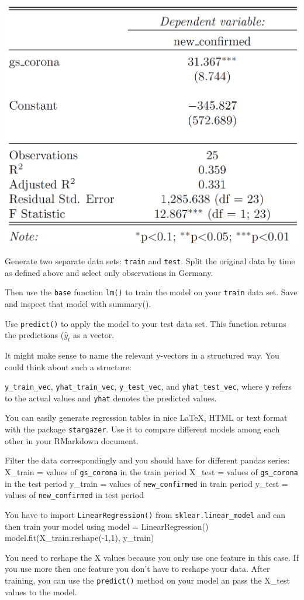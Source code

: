 \documentclass[
  11pt,
]{article}
\newenvironment{tips}[1]
  {
  \begin{itemize}
  \footnotesize
  \renewcommand{\labelitemi}{
    \raisebox{-.7\height}[0pt][0pt]{
      {\setkeys{Gin}{width=3em,keepaspectratio}
        \texttt{[image: images/\#1.png]}}
    }
  }
  \setlength{\fboxsep}{1em}
  \begin{rbox}
  \item
  }
  {
  \end{rbox}
  \end{itemize}
  }
\begin{document}
\begin{center}\includegraphics[width=0.5\linewidth]{plots/reg_table} \end{center}

\begin{tips}r

Generate two separate data sets: \texttt{train} and \texttt{test}. Split the original data by time as defined above and select only observations in Germany.

Then use the \texttt{base} function \texttt{lm()} to train the model on your \texttt{train} data set. Save and inspect that model with summary().

Use \texttt{predict()} to apply the model to your test data set. This function returns the predictions (\(\hat{y}_t\) as a vector.

It might make sense to name the relevant y-vectors in a structured way. You could think about such a structure:

\texttt{y\_train\_vec}, \texttt{yhat\_train\_vec}, \texttt{y\_test\_vec}, and \texttt{yhat\_test\_vec}, where \texttt{y} refers to the actual values and \texttt{yhat} denotes the predicted values.

You can easily generate regression tables in nice LaTeX, HTML or text format with the package \texttt{stargazer}. Use it to compare different models among each other in your RMarkdown document.

\end{tips}

\begin{tips}p

Filter the data correspondingly and you should have for different pandas series:
X\_train = values of \texttt{gs\_corona} in the train period
X\_test = values of \texttt{gs\_corona} in the test period
y\_train = values of \texttt{new\_confirmed} in train period
y\_test = values of \texttt{new\_confirmed} in test period

You have to import \texttt{LinearRegression()} from \texttt{sklear.linear\_model} and can then train your model using
model = LinearRegression()
model.fit(X\_train.reshape(-1,1), y\_train)

You need to reshape the X values because you only use one feature in this case. If you use more then one feature you don't have to reshape your data.
After training, you can use the \texttt{predict()} method on your model an pass the X\_test values to the model.

\end{tips}
\end{document}

